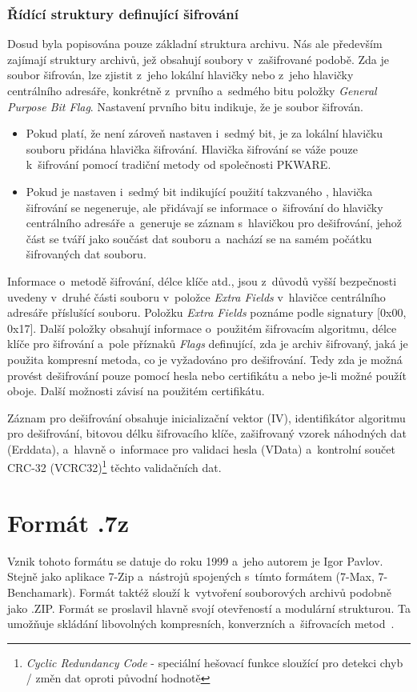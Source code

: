 \subsubsection{Řídící struktury definující šifrování}
 Dosud byla popisována pouze základní struktura archivu. Nás ale především zajímají struktury
archivů, jež obsahují soubory v~zašifrované podobě. Zda je soubor šifrován, lze zjistit z~jeho
lokální hlavičky nebo z~jeho hlavičky centrálního adresáře, konkrétně z~prvního a~sedmého bitu
položky {\it General Purpose Bit Flag}. Nastavení prvního bitu indikuje, že je soubor šifrován.
\begin{itemize}
    \item Pokud platí, že není zároveň nastaven i~sedmý bit, je za lokální hlavičku souboru
        přidána hlavička šifrování. Hlavička šifrování se váže pouze k~šifrování pomocí tradiční
        metody od společnosti PKWARE.
    \item Pokud je nastaven i~sedmý bit indikující použití takzvaného , hlavička šifrování se negeneruje, ale přidávají se informace o~šifrování do
        hlavičky centrálního adresáře a~generuje se záznam s~hlavičkou pro dešifrování, jehož
	část se tváří jako součást dat souboru a~nachází se na samém počátku šifrovaných dat
	souboru.
\end{itemize}
Informace o~metodě šifrování, délce klíče atd., jsou z~důvodů vyšší bezpečnosti uvedeny v~druhé
části souboru v~položce {\it Extra Fields} v~hlavičce centrálního adresáře příslušící souboru.
Položku {\it Extra Fields} poznáme podle signatury [0x00, 0x17]. Další položky obsahují informace
o~použitém šifrovacím algoritmu, délce klíče pro šifrování a~pole příznaků {\it Flags} definující,
zda je archiv šifrovaný, jaká je použita kompresní metoda, co je vyžadováno pro dešifrování. Tedy
zda je možná provést dešifrování pouze pomocí hesla nebo certifikátu a nebo je-li možné použít
oboje. Další možnosti závisí na použitém certifikátu.

 Záznam pro dešifrování obsahuje inicializační vektor (IV), identifikátor algoritmu pro
dešifrování, bitovou délku šifrovacího klíče, zašifrovaný vzorek náhodných dat (Erddata), a~hlavně
o~informace pro validaci hesla (VData) a~kontrolní součet CRC-32 (VCRC32)\footnote{{\it Cyclic Redundancy Code} -
speciální hešovací funkce sloužící pro detekci chyb / změn dat oproti původní hodnotě} těchto
validačních dat. 

\section{Formát .7z}
\label{sec:7z}
Vznik tohoto formátu se datuje do roku 1999 a~jeho autorem je Igor Pavlov. Stejně jako aplikace
7-Zip a~nástrojů spojených s~tímto formátem (7-Max, 7-Benchamark). Formát taktéž slouží
k~vytvoření souborových archivů podobně jako .ZIP. Formát se proslavil hlavně svojí otevřeností a
modulární strukturou. Ta umožňuje skládání libovolných kompresních, konverzních a~šifrovacích
metod~\cite{7z:2015}.


